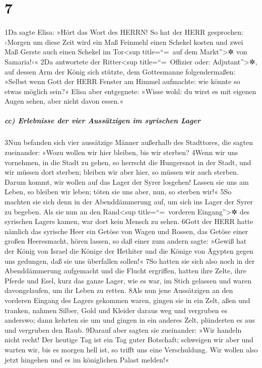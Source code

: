 \hypertarget{section-6}{%
\section{7}\label{section-6}}

1Da sagte Elisa: »Hört das Wort des HERRN! So hat der HERR gesprochen:
›Morgen um diese Zeit wird ein Maß Feinmehl einen Schekel kosten und
zwei Maß Gerste auch einen Schekel im Tor\textless sup title=``=~auf dem
Markt''\textgreater✲ von Samaria!‹« 2Da antwortete der
Ritter\textless sup title=``=~Offizier oder: Adjutant''\textgreater✲,
auf dessen Arm der König sich stützte, dem Gottesmanne folgendermaßen:
»Selbst wenn Gott der HERR Fenster am Himmel aufmachte: wie könnte so
etwas möglich sein?« Elisa aber entgegnete: »Wisse wohl: du wirst es mit
eigenen Augen sehen, aber nicht davon essen.«

\hypertarget{cc-erlebnisse-der-vier-aussuxe4tzigen-im-syrischen-lager}{%
\subparagraph{cc) Erlebnisse der vier Aussätzigen im syrischen
Lager}\label{cc-erlebnisse-der-vier-aussuxe4tzigen-im-syrischen-lager}}

3Nun befanden sich vier aussätzige Männer außerhalb des Stadttores, die
sagten zueinander: »Wozu wollen wir hier bleiben, bis wir sterben? 4Wenn
wir uns vornehmen, in die Stadt zu gehen, so herrscht die Hungersnot in
der Stadt, und wir müssen dort sterben; bleiben wir aber hier, so müssen
wir auch sterben. Darum kommt, wir wollen auf das Lager der Syrer
losgehen! Lassen sie uns am Leben, so bleiben wir leben; töten sie uns
aber, nun, so sterben wir!« 5So machten sie sich denn in der
Abenddämmerung auf, um sich ins Lager der Syrer zu begeben. Als sie nun
an den Rand\textless sup title=``=~vorderen Eingang''\textgreater✲ des
syrischen Lagers kamen, war dort kein Mensch zu sehen. 6Gott der HERR
hatte nämlich das syrische Heer ein Getöse von Wagen und Rossen, das
Getöse einer großen Heeresmacht, hören lassen, so daß einer zum andern
sagte: »Gewiß hat der König von Israel die Könige der Hethiter und die
Könige von Ägypten gegen uns gedungen, daß sie uns überfallen sollen!«
7So hatten sie sich also noch in der Abenddämmerung aufgemacht und die
Flucht ergriffen, hatten ihre Zelte, ihre Pferde und Esel, kurz das
ganze Lager, wie es war, im Stich gelassen und waren davongelaufen, um
ihr Leben zu retten. 8Als nun jene Aussätzigen an den vorderen Eingang
des Lagers gekommen waren, gingen sie in ein Zelt, aßen und tranken,
nahmen Silber, Gold und Kleider daraus weg und vergruben es anderswo;
dann kehrten sie um und gingen in ein anderes Zelt, plünderten es aus
und vergruben den Raub. 9Darauf aber sagten sie zueinander: »Wir handeln
nicht recht! Der heutige Tag ist ein Tag guter Botschaft; schweigen wir
aber und warten wir, bis es morgen hell ist, so trifft uns eine
Verschuldung. Wir wollen also jetzt hingehen und es im königlichen
Palast melden!«

